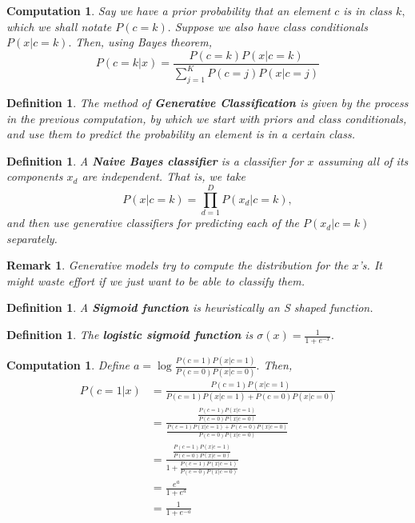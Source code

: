 \documentclass{amsart}
\newtheorem{comp}[subsubsection]{Computation}
\newtheorem{defn}[subsubsection]{Definition}
\newtheorem{rem}[subsubsection]{Remark}
\begin{document}
\begin{comp}
Say we have a prior probability that an element $c$ is in class $k,$ which we shall notate $P(c=k).$ 
Suppose we also have class conditionals $P(x|c=k).$
Then, using Bayes theorem,
$$P(c = k|x) = \frac {P(c=k)P(x|c=k)}{\sum_{j=1}^K P(c=j)P(x|c=j)}$$
\end{comp}

\begin{defn}
The method of {\bf Generative Classification} is given by the process in the previous computation, by which we start with priors and class conditionals, and use them to predict the probability an element is in a certain class.
\end{defn}

\begin{defn}
A {\bf Naive Bayes classifier} is a classifier for $x$ assuming all of its components $x_d$ are independent. That is, we take 
$$P(x|c=k) = \prod_{d=1}^D P(x_d|c=k),$$
and then use generative classifiers for predicting each of the $P(x_d|c=k)$ separately.
\end{defn}

\begin{rem}
Generative models try to compute the distribution for the $x$'s. It might waste effort if we just want to be able to classify them.
\end{rem}

\begin{defn}
A {\bf Sigmoid function} is heuristically an S shaped function. 
\end{defn}

\begin{defn}
The {\bf logistic sigmoid function} is $\sigma(x) = \frac 1 {1+e^{-x}}.$
\end{defn}

\begin{comp}
Define $a = \log \frac{P(c=1)P(x|c=1)}{P(c=0)P(x|c=0)}.$ Then,
\begin{align*}
P(c=1|x) &= \frac{P(c=1)P(x|c=1)}{P(c=1)P(x|c=1)+P(c=0)P(x|c=0)}
\\
&= \frac{\frac{P(c=1)P(x|c=1)}{P(c=0)P(x|c=0)}}{\frac{P(c=1)P(x|c=1)+P(c=0)P(x|c=0)}{P(c=0)P(x|c=0)}}
\\
&= \frac{\frac{P(c=1)P(x|c=1)}{P(c=0)P(x|c=0)}}{1+\frac{P(c=1)P(x|c=1)}{P(c=0)P(x|c=0)}}
\\
& = \frac{e^a}{1+e^a}
\\
& = \frac 1 {1+e^{-a}}
\end{align*}

\end{comp}
\end{document}
